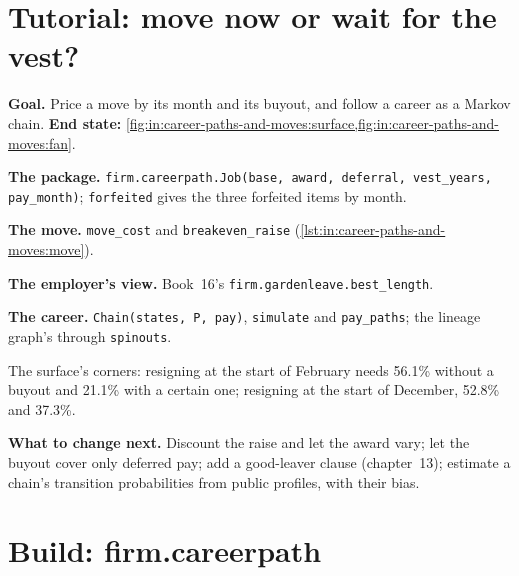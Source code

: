 \section{Tutorial: move now or wait for the vest?}\label{tut:in:career-paths-and-moves:tut}

\begin{tutorial}
\textbf{Goal.} Price a move by its month and its buyout, and follow a career as a Markov chain.
\textbf{End state:} \cref{fig:in:career-paths-and-moves:surface,fig:in:career-paths-and-moves:fan}.
\begin{tutsteps}
\item \textbf{The package.} \texttt{firm.careerpath.Job(base, award, deferral, vest\_years, pay\_month)}; \texttt{forfeited}
gives the three forfeited items by month.
\item \textbf{The move.} \texttt{move\_cost} and \texttt{breakeven\_raise} (\cref{lst:in:career-paths-and-moves:move}).
\label{lst:in:career-paths-and-moves:move}
\item \textbf{The employer's view.} Book~16's \texttt{firm.gardenleave.best\_length}.
\item \textbf{The career.} \texttt{Chain(states, P, pay)}, \texttt{simulate} and \texttt{pay\_paths}; the lineage graph's
 through \texttt{spinouts}.
\end{tutsteps}
\end{tutorial}

The surface's corners: resigning at the start of February needs 56.1\% without a buyout and 21.1\% with a certain one;
resigning at the start of December, 52.8\% and 37.3\%.

\textbf{What to change next.} Discount the raise and let the award vary; let the buyout cover only deferred pay; add a
good-leaver clause (chapter~13); estimate a chain's transition probabilities from public profiles, with their bias.

\section{Build: firm.careerpath}\label{bld:in:career-paths-and-moves:careerpath}

